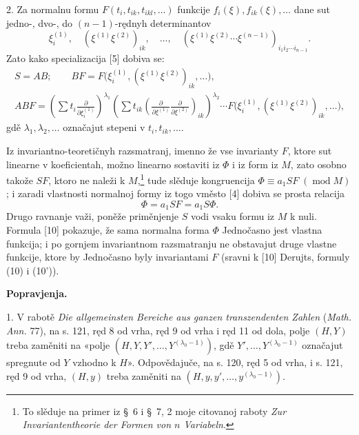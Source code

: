 \documentclass[11pt]{article}
\providecommand{\p}{\partial}
\providecommand{\modu}[1]{\;(\operatorname{mod} #1)}
\begin{document}
2. Za normalnu formu \(F(t_i,t_{ik},t_{ikl},\ldots)\) funkcije \(f_i(\xi),f_{ik}(\xi),\ldots\) dane sut jedno-, dvo-, do \((n-1)\)-rędnyh determinantov
\[
        \xi_i^{(1)},\quad (\xi^{(1)}\xi^{(2)})_{ik},\quad\ldots,\quad
        (\xi^{(1)}\xi^{(2)}\cdots\xi^{(n-1)})_{i_1i_2\cdots i_{n-1}}.
\]
Zato kako specializacija [5] dobiva se:
\[
\begin{gathered}
        S=AB;\qquad
        BF=F\bigl(\xi_i^{(1)},(\xi^{(1)}\xi^{(2)})_{ik},\ldots\bigr),\\
        ABF=\left(\sum t_i\frac{\p}{\p\xi_i^{(1)}}\right)^{\lambda_1}
        \left(\sum t_{ik}\left(\frac{\p}{\p\xi^{(1)}}\frac{\p}{\p\xi^{(2)}}\right)_{ik}\right)^{\lambda_2}
        \cdots F\bigl(\xi_i^{(1)},(\xi^{(1)}\xi^{(2)})_{ik},\ldots\bigr),
\end{gathered}
\]
gdě \(\lambda_1,\lambda_2,\ldots\) označajut stepeni v \(t_i,t_{ik},\ldots\).

Iz invariantno-teoretičnyh razsmatranj, imenno že vse invarianty \(F\), ktore sut linearne v koeficientah, možno linearno sostaviti iz \(\Phi\) i iz form iz \(M\), zato osobno takože \(SF\), ktoro ne naleži k \(M\),\footnote{To slěduje na primer iz \S~6 i \S~7, 2 moje citovanoj raboty \emph{Zur Invariantentheorie der Formen von \(n\) Variabeln}.} tude slěduje kongruencija \(\Phi\equiv a_1SF\modu{M}\); i zaradi vlastnosti normalnoj formy iz togo vměsto [4] dobiva se prosta relacija
\begin{equation}
        \Phi=a_1SF=a_1S\Phi.
\tag{10}
\end{equation}
Drugo ravnanje važi, poněže priměnjenje \(S\) vodi vsaku formu iz \(M\) k nuli. Formula [10] pokazuje, že sama normalna forma \(\Phi\) Jednočasno jest vlastna funkcija; i po gornjem invariantnom razsmatranju ne obstavajut druge vlastne funkcije, ktore by Jednočasno byly invariantami \(F\) (sravni k [10] Derujts, formuly (10) i (10')).

\begin{center}
\textbf{Popravjenja.}
\end{center}

1. V rabotě \emph{Die allgemeinsten Bereiche aus ganzen transzendenten Zahlen} (\emph{Math. Ann.} 77), na s. 121, ręd 8 od vrha, ręd 9 od vrha i ręd 11 od dola, polje \((H,Y)\) treba zaměniti na «polje \((H,Y,Y',\ldots,Y^{(\lambda_0-1)})\), gdě \(Y',\ldots,Y^{(\lambda_0-1)}\) označajut spregnute od \(Y\) vzhodno k \(H\)». Odpovědajuče, na s. 120, ręd 5 od vrha, i s. 121, ręd 9 od vrha, \((H,y)\) treba zaměniti na \((H,y,y',\ldots,y^{(\lambda_0-1)})\).
\end{document}
